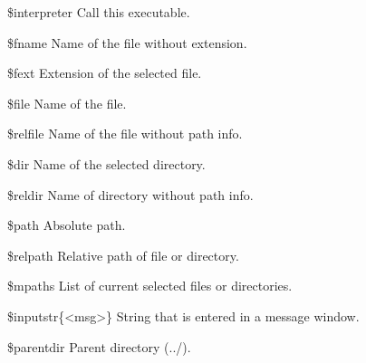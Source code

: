 
%
\begin{codeentry}
\item[\$interpreter] Call this executable.%
\item[\$fname] Name of the file without extension. %
\item[\$fext] Extension of the selected file. %
\item[\$file] Name of the file. %
\item[\$relfile] Name of the file without path info. %
\item[\$dir] Name of the selected directory. %
\item[\$reldir] Name of directory without path info. %
\item[\$path] Absolute path. %
\item[\$relpath] Relative path of file or directory. %
\item[\$mpaths] List of current selected files or directories. %
\item[\$inputstr\{<msg>\}] String that is entered in a message window. %
\item[\$parentdir] Parent directory (../). %
\end{codeentry}

%
%
%
%
%

